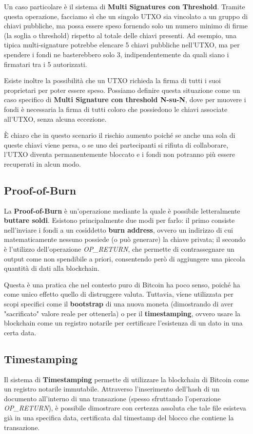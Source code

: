 Un caso particolare è il sistema di \textbf{Multi Signatures con Threshold}. Tramite questa operazione, facciamo sì che un singolo UTXO sia vincolato a un gruppo di chiavi pubbliche, ma possa essere speso fornendo solo un numero minimo di firme (la soglia o threshold) rispetto al totale delle chiavi presenti. Ad esempio, una tipica multi-signature potrebbe elencare 5 chiavi pubbliche nell'UTXO, ma per spendere i fondi ne basterebbero solo 3, indipendentemente da quali siano i firmatari tra i 5 autorizzati.

Esiste inoltre la possibilità che un UTXO richieda la firma di tutti i suoi proprietari per poter essere speso. Possiamo definire questa situazione come un caso specifico di \textbf{Multi Signature con threshold N-su-N}, dove per muovere i fondi è necessaria la firma di tutti coloro che possiedono le chiavi associate all'UTXO, senza alcuna eccezione.

È chiaro che in questo scenario il rischio aumento poiché se anche una sola di queste chiavi viene persa, o se uno dei partecipanti si rifiuta di collaborare, l'UTXO diventa permanentemente bloccato e i fondi non potranno più essere recuperati in alcun modo.

\subsection{Proof-of-Burn}
La \textbf{Proof-of-Burn} è un'operazione mediante la quale è possibile letteralmente \textbf{buttare soldi}. Esistono principalmente due modi per farlo: il primo consiste nell'inviare i fondi a un cosiddetto \textbf{burn address}, ovvero un indirizzo di cui matematicamente nessuno possiede (o può generare) la chiave privata; il secondo è l'utilizzo dell'operazione \textit{OP\_RETURN}, che permette di contrassegnare un output come non spendibile a priori, consentendo però di aggiungere una piccola quantità di dati alla blockchain.

Questa è una pratica che nel contesto puro di Bitcoin ha poco senso, poiché ha come unico effetto quello di distruggere valuta. Tuttavia, viene utilizzata per scopi specifici come il \textbf{bootstrap} di una nuova moneta (dimostrando di aver "sacrificato" valore reale per ottenerla) o per il \textbf{timestamping}, ovvero usare la blockchain come un registro notarile per certificare l'esistenza di un dato in una certa data.

\subsection{Timestamping}
Il sistema di \textbf{Timestamping} permette di utilizzare la blockchain di Bitcoin come un registro notarile immutabile. Attraverso l'inserimento dell'hash di un documento all'interno di una transazione (spesso sfruttando l'operazione \textit{OP\_RETURN}), è possibile dimostrare con certezza assoluta che tale file esisteva già in una specifica data, certificata dal timestamp del blocco che contiene la transazione.

